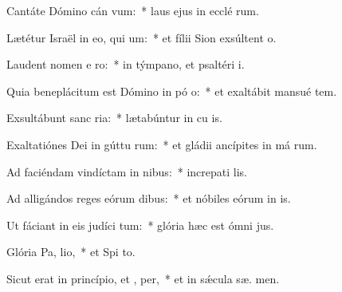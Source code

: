 \item Cantáte Dómino cán vum:~* laus ejus in ecclé rum.
\item Lætétur Israël in eo, qui  um:~* et fílii Sion exsúltent   o.
\item Laudent nomen e  ro:~* in týmpano, et psaltéri  i.
\item Quia beneplácitum est Dómino in pó o:~* et exaltábit mansué  tem.
\item Exsultábunt sanc  ria:~* lætabúntur in cu is.
\item Exaltatiónes Dei in gúttu rum:~* et gládii ancípites in má rum.
\item Ad faciéndam vindíctam in nibus:~* increpati  lis.
\item Ad alligándos reges eórum  dibus:~* et nóbiles eórum in  is.
\item Ut fáciant in eis judíci tum:~* glória hæc est ómni  jus.
\item Glória Pa,  lio,~* et Spi to.
\item Sicut erat in princípio, et ,  per,~* et in sǽcula sæ. men.
